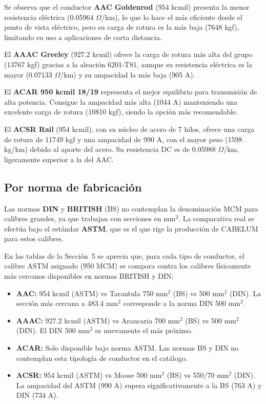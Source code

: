 \documentclass[12pt,a4paper]{article}
\begin{document}
Se observa que el conductor \textbf{AAC Goldenrod} (954 kcmil) presenta la
menor resistencia eléctrica (0.05964 $\Omega$/km), lo que lo hace el más
eficiente desde el punto de vista eléctrico, pero su carga de rotura es la
más baja (7648 kgf), limitando su uso a aplicaciones de corta distancia.

El \textbf{AAAC Greeley} (927.2 kcmil) ofrece la carga de rotura más alta del
grupo (13767 kgf) gracias a la aleación 6201-T81, aunque su resistencia
eléctrica es la mayor (0.07133 $\Omega$/km) y su ampacidad la más baja (905 A).

El \textbf{ACAR 950 kcmil 18/19} representa el mejor equilibrio para transmisión
de alta potencia. Consigue la ampacidad más alta (1044 A) manteniendo una
excelente carga de rotura (10810 kgf), siendo la opción más recomendable.

El \textbf{ACSR Rail} (954 kcmil), con su núcleo de acero de 7 hilos, ofrece
una carga de rotura de 11749 kgf y una ampacidad de 990 A, con el mayor peso
(1598 kg/km) debido al aporte del acero. Su resistencia DC es de 0.05988
$\Omega$/km, ligeramente superior a la del AAC.

\subsection{Por norma de fabricación}

Las normas \textbf{DIN} y \textbf{BRITISH} (BS) no contemplan la denominación
MCM para calibres grandes, ya que trabajan con secciones en mm$^2$. La
comparativa real se efectúa bajo el estándar \textbf{ASTM}, que es el que rige
la producción de CABELUM para estos calibres.

En las tablas de la Sección~5 se aprecia que, para cada tipo de conductor, el
calibre ASTM asignado (950 MCM) se compara contra los calibres físicamente más
cercanos disponibles en normas BRITISH y DIN:

\begin{itemize}
    \item \textbf{AAC:} 954 kcmil (ASTM) vs Tarantula 750 mm$^2$ (BS) vs
        500 mm$^2$ (DIN). La sección más cercana a 483.4 mm$^2$ corresponde
        a la norma DIN 500 mm$^2$.
    \item \textbf{AAAC:} 927.2 kcmil (ASTM) vs Araucaria 700 mm$^2$ (BS) vs
        500 mm$^2$ (DIN). El DIN 500 mm$^2$ es nuevamente el más próximo.
    \item \textbf{ACAR:} Solo disponible bajo norma ASTM. Las normas BS y DIN
        no contemplan esta tipología de conductor en el catálogo.
    \item \textbf{ACSR:} 954 kcmil (ASTM) vs Moose 500 mm$^2$ (BS) vs
        550/70 mm$^2$ (DIN). La ampacidad del ASTM (990 A) supera
        significativamente a la BS (763 A) y DIN (734 A).
\end{itemize}
\end{document}
